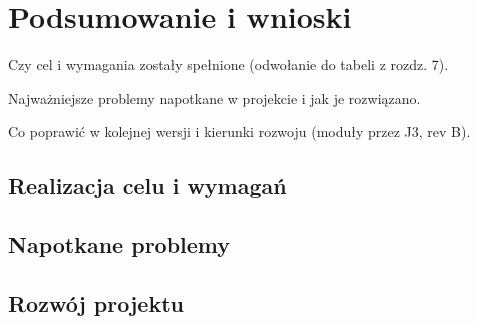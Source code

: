 \chapter{Podsumowanie i wnioski}\label{ch:podsumowanie}
\begin{zawartosc}
  \item Czy cel i wymagania zostały spełnione (odwołanie do tabeli z rozdz. 7).
  \item Najważniejsze problemy napotkane w projekcie i jak je rozwiązano.
  \item Co poprawić w kolejnej wersji i kierunki rozwoju (moduły przez J3, rev B).
\end{zawartosc}

\section{Realizacja celu i wymagań}\label{sec:realizacja}

\section{Napotkane problemy}\label{sec:problemy}

\section{Rozwój projektu}\label{sec:rozwoj}

